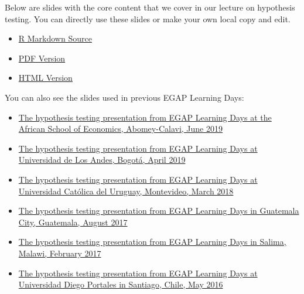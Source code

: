 \documentclass[12pt,]{book}
\begin{document}
Below are slides with the core content that we cover in our lecture on hypothesis testing. You can directly use these slides or make your own local copy and edit.

\begin{itemize}
\item
  \href{https://egap.github.io/learningdays-resources/Slides/hypothesistesting-slides.Rmd}{R Markdown Source}
\item
  \href{https://egap.github.io/learningdays-resources/Slides/hypothesistesting-slides.pdf}{PDF Version}
\item
  \href{https://egap.github.io/learningdays-resources/Slides/hypothesistesting-slides.html}{HTML Version}
\end{itemize}

You can also see the slides used in previous EGAP Learning Days:

\begin{itemize}
\item
  \href{https://egap.github.io/learningdays-resources/Slides/Examples/hypothesistesting-benin.pdf}{The hypothesis testing presentation from EGAP Learning Days at the African School of Economics, Abomey-Calavi, June 2019}
\item
  \href{https://egap.github.io/learningdays-resources/Slides/Examples/hypothesistesting-bogota.pdf}{The hypothesis testing presentation from EGAP Learning Days at Universidad de Los Andes, Bogotá, April 2019}
\item
  \href{https://egap.github.io/learningdays-resources/Slides/Examples/hypothesistesting-montevideo.pdf}{The hypothesis testing presentation from EGAP Learning Days at Universidad Católica del Uruguay, Montevideo, March 2018}
\item
  \href{https://egap.github.io/learningdays-resources/Slides/Examples/hypothesistesting-guatemala.pdf}{The hypothesis testing presentation from EGAP Learning Days in Guatemala City, Guatemala, August 2017}
\item
  \href{https://egap.github.io/learningdays-resources/Slides/Examples/hypothesistesting-malawi.pdf}{The hypothesis testing presentation from EGAP Learning Days in Salima, Malawi, February 2017}
\item
  \href{https://egap.github.io/learningdays-resources/Slides/Examples/hypothesistesting-santiago.pdf}{The hypothesis testing presentation from EGAP Learning Days at Universidad Diego Portales in Santiago, Chile, May 2016}
\end{itemize}
\end{document}
